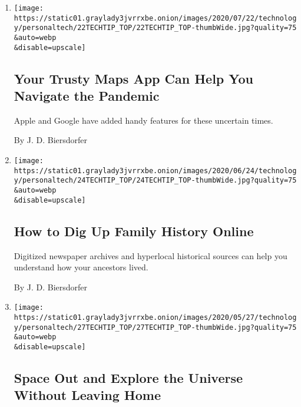 \begin{enumerate}
\def\labelenumi{\arabic{enumi}.}
\item
  \href{/2020/07/22/technology/personaltech/maps-apps-coronavirus-pandemic.html}{}

  \texttt{[image: https://static01.graylady3jvrrxbe.onion/images/2020/07/22/technology/personaltech/22TECHTIP\_TOP/22TECHTIP\_TOP-thumbWide.jpg?quality=75\\\&auto=webp\\\&disable=upscale]}

  \hypertarget{your-trusty-maps-app-can-help-you-navigate-the-pandemic}{%
  \subsection{Your Trusty Maps App Can Help You Navigate the
  Pandemic}\label{your-trusty-maps-app-can-help-you-navigate-the-pandemic}}

  Apple and Google have added handy features for these uncertain times.

  By J. D. Biersdorfer
\item
  \href{/2020/06/24/technology/personaltech/family-history-genealogy-online.html}{}

  \texttt{[image: https://static01.graylady3jvrrxbe.onion/images/2020/06/24/technology/personaltech/24TECHTIP\_TOP/24TECHTIP\_TOP-thumbWide.jpg?quality=75\\\&auto=webp\\\&disable=upscale]}

  \hypertarget{how-to-dig-up-family-history-online}{%
  \subsection{How to Dig Up Family History
  Online}\label{how-to-dig-up-family-history-online}}

  Digitized newspaper archives and hyperlocal historical sources can
  help you understand how your ancestors lived.

  By J. D. Biersdorfer
\item
  \href{/2020/05/27/technology/personaltech/techtip-nasa-apps.html}{}

  \texttt{[image: https://static01.graylady3jvrrxbe.onion/images/2020/05/27/technology/personaltech/27TECHTIP\_TOP/27TECHTIP\_TOP-thumbWide.jpg?quality=75\\\&auto=webp\\\&disable=upscale]}

  \hypertarget{space-out-and-explore-the-universe-without-leaving-home}{%
  \subsection{Space Out and Explore the Universe Without Leaving
  Home}\label{space-out-and-explore-the-universe-without-leaving-home}}


\end{enumerate}

